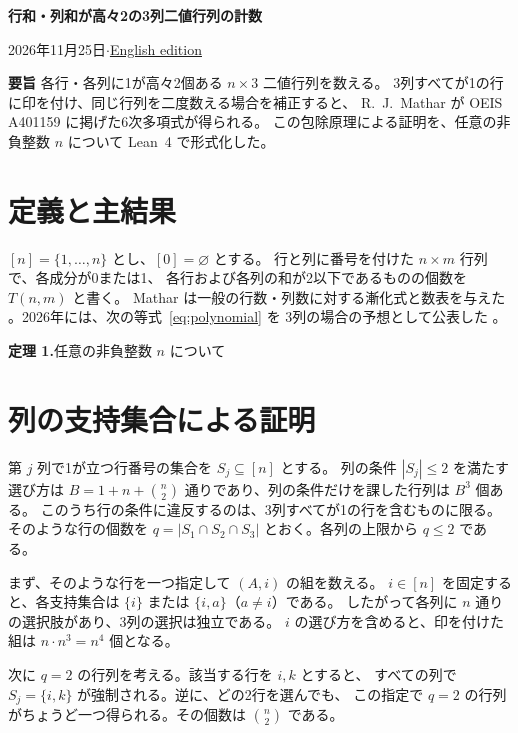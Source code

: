 \documentclass[a4paper,10pt]{ltjsarticle}
\newcommand{\rows}{[n]}
\begin{document}
\begin{center}
  {\LARGE\bfseries 行和・列和が高々2の3列二値行列の計数\par}
  \vspace{5pt}
  {\small 2026年11月25日\quad$\cdot$\quad\href{https://github.com/nktkt/math/blob/main/research/mathar_three_columns/output/pdf/three-columns.pdf}{English edition}\par}
\end{center}
\smallskip

\noindent\textbf{要旨}\quad
各行・各列に1が高々2個ある $n\times3$ 二値行列を数える。
3列すべてが1の行に印を付け、同じ行列を二度数える場合を補正すると、
R.~J.~Mathar が OEIS A401159 に掲げた6次多項式が得られる。
この包除原理による証明を、任意の非負整数 $n$ について Lean~4 で形式化した。

\section{定義と主結果}
$\rows=\{1,\ldots,n\}$ とし、$[0]=\varnothing$ とする。
行と列に番号を付けた $n\times m$ 行列で、各成分が0または1、
各行および各列の和が2以下であるものの個数を $T(n,m)$ と書く。
Mathar は一般の行数・列数に対する漸化式と数表を与えた
\cite[第2節、表2]{mathar2014}。2026年には、次の等式~\eqref{eq:polynomial} を
3列の場合の予想として公表した \cite{oeis}。

\smallskip
\noindent\textbf{定理 1.}\quad 任意の非負整数 $n$ について
\threeColumnIdentities

\section{列の支持集合による証明}
第 $j$ 列で1が立つ行番号の集合を $S_j\subseteq\rows$ とする。
列の条件 $|S_j|\leq 2$ を満たす選び方は
$B=1+n+\binom n2$ 通りであり、列の条件だけを課した行列は $B^3$ 個ある。
このうち行の条件に違反するのは、3列すべてが1の行を含むものに限る。
そのような行の個数を $q=|S_1\cap S_2\cap S_3|$ とおく。各列の上限から $q\leq 2$ である。

まず、そのような行を一つ指定して $(A,i)$ の組を数える。
$i\in\rows$ を固定すると、各支持集合は $\{i\}$ または $\{i,a\}$（$a\ne i$）である。
したがって各列に $n$ 通りの選択肢があり、3列の選択は独立である。
$i$ の選び方を含めると、印を付けた組は $n\cdot n^3=n^4$ 個となる。

次に $q=2$ の行列を考える。該当する行を $i,k$ とすると、
すべての列で $S_j=\{i,k\}$ が強制される。逆に、どの2行を選んでも、
この指定で $q=2$ の行列がちょうど一つ得られる。その個数は $\binom n2$ である。
\end{document}
